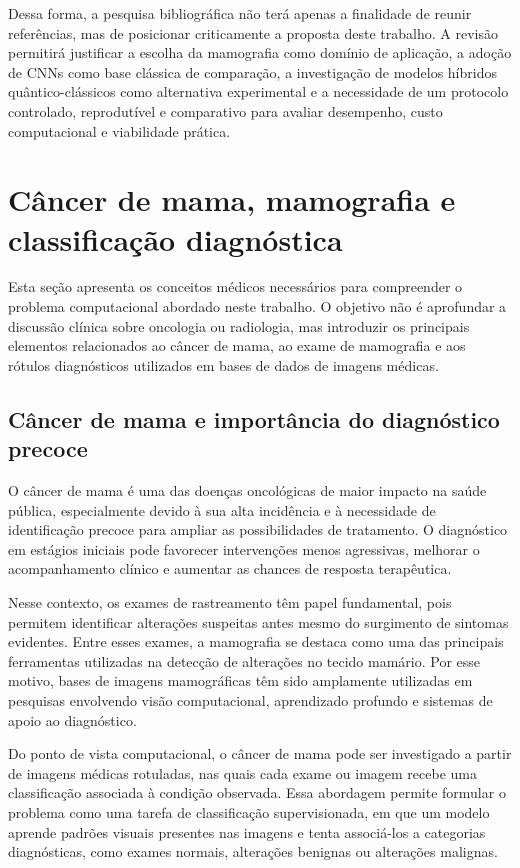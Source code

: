 \documentclass[
    12pt,
    openright,
    oneside,
    a4paper,
    english,
    brazil
]{abntex2}
\begin{document}
Dessa forma, a pesquisa bibliográfica não terá apenas a finalidade de reunir referências, mas de posicionar criticamente a proposta deste trabalho. A revisão permitirá justificar a escolha da mamografia como domínio de aplicação, a adoção de CNNs como base clássica de comparação, a investigação de modelos híbridos quântico-clássicos como alternativa experimental e a necessidade de um protocolo controlado, reprodutível e comparativo para avaliar desempenho, custo computacional e viabilidade prática.

\section{Câncer de mama, mamografia e classificação diagnóstica}

Esta seção apresenta os conceitos médicos necessários para compreender o problema computacional abordado neste trabalho. O objetivo não é aprofundar a discussão clínica sobre oncologia ou radiologia, mas introduzir os principais elementos relacionados ao câncer de mama, ao exame de mamografia e aos rótulos diagnósticos utilizados em bases de dados de imagens médicas.

\subsection{Câncer de mama e importância do diagnóstico precoce}

O câncer de mama é uma das doenças oncológicas de maior impacto na saúde pública, especialmente devido à sua alta incidência e à necessidade de identificação precoce para ampliar as possibilidades de tratamento. O diagnóstico em estágios iniciais pode favorecer intervenções menos agressivas, melhorar o acompanhamento clínico e aumentar as chances de resposta terapêutica.

Nesse contexto, os exames de rastreamento têm papel fundamental, pois permitem identificar alterações suspeitas antes mesmo do surgimento de sintomas evidentes. Entre esses exames, a mamografia se destaca como uma das principais ferramentas utilizadas na detecção de alterações no tecido mamário. Por esse motivo, bases de imagens mamográficas têm sido amplamente utilizadas em pesquisas envolvendo visão computacional, aprendizado profundo e sistemas de apoio ao diagnóstico.

Do ponto de vista computacional, o câncer de mama pode ser investigado a partir de imagens médicas rotuladas, nas quais cada exame ou imagem recebe uma classificação associada à condição observada. Essa abordagem permite formular o problema como uma tarefa de classificação supervisionada, em que um modelo aprende padrões visuais presentes nas imagens e tenta associá-los a categorias diagnósticas, como exames normais, alterações benignas ou alterações malignas.
\end{document}
